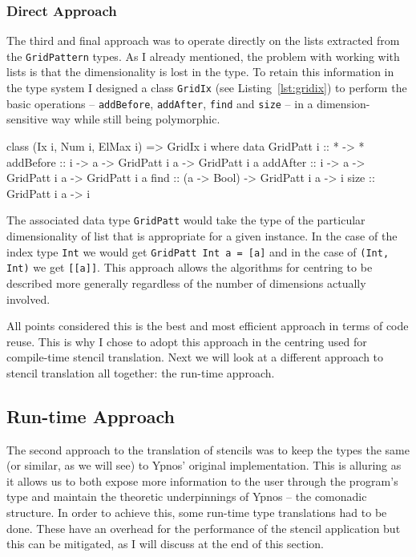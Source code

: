 \documentclass[12pt,a4paper,twoside]{scrbook}
\begin{document}
\subsubsection{Direct Approach}

The third and final approach was to operate directly on the lists extracted from
the \texttt{GridPattern} types. As I already mentioned, the problem with working
with lists is that the dimensionality is lost in the type. To retain this
information in the type system I designed a class \texttt{GridIx} (see
Listing~\ref{lst:gridix}) to perform the basic operations -- \texttt{addBefore},
\texttt{addAfter}, \texttt{find} and \texttt{size} -- in a dimension-sensitive
way while still being polymorphic.

\begin{hflisting}[label={lst:gridix}, caption=The class declaration of
  \texttt{GridIx} showing the main functions defined for the grid manipulation.]
class (Ix i, Num i, ElMax i) => GridIx i where
    data GridPatt i :: * -> *
    addBefore :: i -> a -> GridPatt i a -> GridPatt i a
    addAfter :: i -> a -> GridPatt i a -> GridPatt i a
    find :: (a -> Bool) -> GridPatt i a -> i
    size :: GridPatt i a -> i
\end{hflisting}

The associated data type \texttt{GridPatt} would take the type of the particular
dimensionality of list that is appropriate for a given instance. In the case of
the index type \texttt{Int} we would get \texttt{GridPatt Int a = {[}a{]}} and
in the case of \texttt{(Int, Int)} we get \texttt{{[}{[}a{]}{]}}. This approach
allows the algorithms for centring to be described more generally regardless of
the number of dimensions actually involved.

All points considered this is the best and most efficient approach in terms of
code reuse. This is why I chose to adopt this approach in the centring used for
compile-time stencil translation. Next we will look at a different approach to
stencil translation all together: the run-time approach.

\subsection{Run-time Approach}
\label{sec:runtimetrans}

The second approach to the translation of stencils was to keep the types the
same (or similar, as we will see) to Ypnos' original implementation.  This is
alluring as it allows us to both expose more information to the user through the
program's type and maintain the theoretic underpinnings of Ypnos -- the
comonadic structure. In order to achieve this, some run-time type translations
had to be done. These have an overhead for the performance of the stencil
application but this can be mitigated, as I will discuss at the end of this
section.
\end{document}
